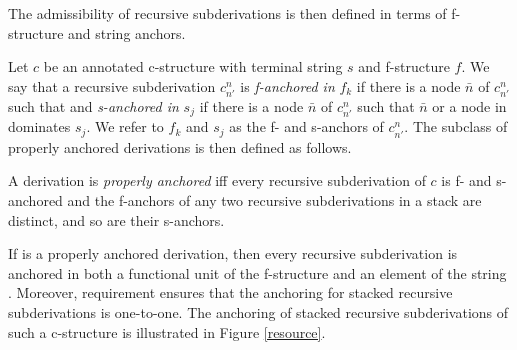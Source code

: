 \documentclass[output=paper,hidelinks]{langscibook}
\begin{document}
The admissibility of recursive subderivations is then defined in terms of f-structure and string anchors.

\def\ehead{\mb{\phiinv\hsp{-.2em} \circ \hsp{-.1em}\phi}\xspace}
\ea\label{Anchordef}%
Let $c$ be an annotated c-structure  with terminal string $s$ and f-structure $f$.   
We say that a recursive subderivation $c^n_{n'}$ is
\ea\label{fanchor} \textit{f-anchored in} $f_k$ if there is a node $\bar{n}$ of $c^n_{n'}$ such that   and
\ex\label{sanchor} \textit{s-anchored in} $s_j$ if there is a node $\bar{n}$ of $c^n_{n'}$ such that  $\bar{n}$ or a node in \mb{\ehead(\bar{n})} dominates $s_j$.
\z\z
We refer to $f_k$ and $s_j$ as the f- and s-anchors of $c^n_{n'}$. The subclass of properly anchored derivations is then defined as follows.

\ea\label{conservecs}%
A derivation    is \textit{properly anchored} iff 
\ea\label{anchored}every recursive subderivation  of $c$  is f- and s-anchored and
\ex\label{distinct} the f-anchors of any two recursive subderivations in a stack are distinct, and so are their s-anchors.
\z\z

\noindent If   is a properly anchored derivation, then every recursive subderivation is anchored in both a 
functional unit of the f-structure and an element of the string . Moreover,  requirement  ensures that the anchoring for stacked recursive subderivations is one-to-one. The anchoring of stacked recursive subderivations of such a c-structure is illustrated in Figure \ref{resource}.
\end{document}
